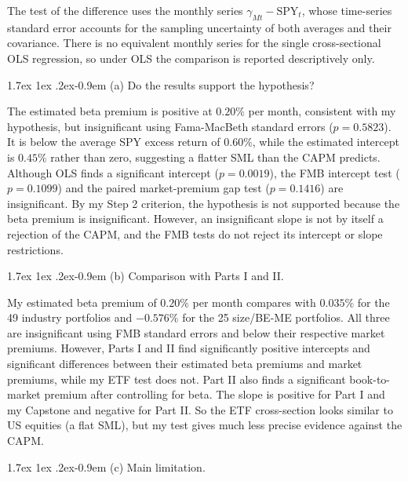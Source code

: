 \documentclass[11pt]{article}
\makeatletter
\renewcommand\paragraph{\@startsection{paragraph}{4}{0pt}%
  {1.7ex \@plus 1ex \@minus .2ex}{-0.9em}%
  {\normalfont\bfseries\normalsize\color{psink}}}
\makeatother
\begin{document}
The test of the difference uses the monthly series
$\gamma_{Mt} - \text{SPY}_t$, whose time-series standard error accounts for the
sampling uncertainty of both averages and their covariance. There is no
equivalent monthly series for the single cross-sectional OLS regression, so
under OLS the comparison is reported descriptively only.

\paragraph{(a) Do the results support the hypothesis?}

The estimated beta premium is positive at $0.20\%$ per month, consistent with
my hypothesis, but insignificant using Fama-MacBeth standard errors
($p = 0.5823$). It is below the average SPY excess return of $0.60\%$, while
the estimated intercept is $0.45\%$ rather than zero, suggesting a flatter SML
than the CAPM predicts. Although OLS finds a significant intercept
($p = 0.0019$), the FMB intercept test ($p = 0.1099$) and the paired
market-premium gap test ($p = 0.1416$) are insignificant. By my Step 2
criterion, the hypothesis is not supported because the beta premium is
insignificant. However, an insignificant slope is not by itself a rejection of
the CAPM, and the FMB tests do not reject its intercept or slope restrictions.

\paragraph{(b) Comparison with Parts I and II.}

My estimated beta premium of $0.20\%$ per month compares with $0.035\%$ for the
49 industry portfolios and $-0.576\%$ for the 25 size/BE-ME portfolios. All
three are insignificant using FMB standard errors and below their respective
market premiums. However, Parts I and II find significantly positive intercepts
and significant differences between their estimated beta premiums and market
premiums, while my ETF test does not. Part II also finds a significant
book-to-market premium after controlling for beta. The slope is positive for
Part I and my Capstone and negative for Part II. So the ETF cross-section looks
similar to US equities (a flat SML), but my test gives much less precise
evidence against the CAPM.

\paragraph{(c) Main limitation.}
\end{document}
